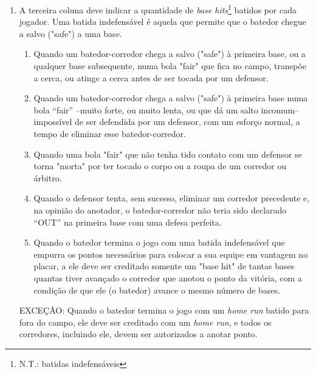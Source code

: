 \begin{multicols}{2}
\begin{enumerate}[label= \arabic*)]
		\item A terceira coluna deve indicar a quantidade de \textit{base hits}\footnote{N.T.: batidas indefensáveis}
		batidos por cada jogador. Uma batida indefensável é aquela que permite que o
		batedor chegue a salvo ("safe") a uma base.
		\begin{enumerate}[label= (\alph*)]
			\item Quando um batedor-corredor chega a salvo ("safe") à primeira base, ou a qualquer base subsequente, numa bola "fair" que fica no campo, transpõe a cerca, ou atinge a cerca antes de ser tocada por um defensor.
			\item Quando um batedor-corredor chega a salvo ("safe") à primeira base numa bola “fair” –muito forte, ou muito lenta, ou que dá um salto incomum– impossível de ser defendida por um defensor, com um esforço normal, a tempo de eliminar esse batedor-corredor.
			\item Quando uma bola "fair" que não tenha tido contato com um defensor se torna "morta" por ter tocado o corpo ou a roupa de um corredor ou árbitro.
			\item Quando o defensor tenta, sem sucesso, eliminar um corredor precedente e, na opinião do anotador, o batedor-corredor não teria sido declarado “OUT” na primeira base com uma defesa perfeita.
			\item  Quando o batedor termina o jogo com uma batida indefensável que empurra os pontos necessários para colocar a sua equipe em vantagem no placar, a ele deve ser creditado somente um "base hit" de tantas bases quantas tiver avançado o corredor que anotou o ponto da vitória, com a condição de que ele (o batedor) avance o mesmo número de bases.
		\end{enumerate}

		EXCEÇÃO: Quando o batedor termina o jogo com um \textit{home run} batido para fora do campo, ele deve ser creditado com um \textit{home run}, e todos os corredores, incluindo ele, devem ser autorizados a anotar ponto.


\end{enumerate}
\end{multicols}

